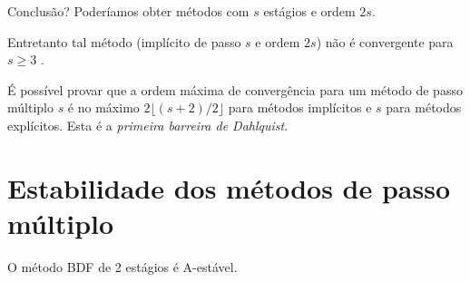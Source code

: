 Conclusão? Poderíamos obter métodos com $s$ estágios e ordem $2s$.

Entretanto tal método (implícito de passo $s$ e ordem $2s$) não é convergente para $s\geq 3$ .

É possível provar que a ordem máxima de convergência para um método de passo múltiplo $s$ é no máximo  $2\lfloor(s+2)/2\rfloor$ para métodos implícitos e $s$ para métodos explícitos. Esta é a \emph{primeira barreira de Dahlquist}.













\section{Estabilidade dos métodos de passo múltiplo}


\begin{teo}
O método BDF de 2 estágios é A-estável.
\end{teo}

